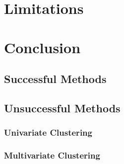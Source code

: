 \documentclass[11pt, a4paper]{article}
\begin{document}
\pagebreak 
\section{Limitations}

























\pagebreak 
\section{Conclusion}


\subsection{Successful Methods}











\subsection{Unsuccessful Methods}

\subsubsection{Univariate Clustering}









\subsubsection{Multivariate Clustering}
\end{document}
